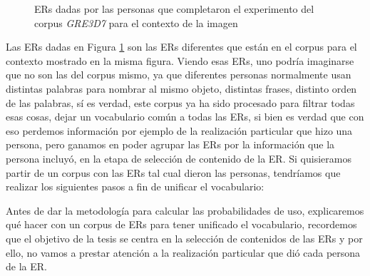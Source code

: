 \begin{figure}[H]
\begin{minipage}[b]{0.5\linewidth}
{%
}
\end{minipage}
\caption{ERs dadas por las personas que completaron el experimento del corpus \textit{GRE3D7} para el contexto de la imagen}\label{fig4-4}
\end{figure}
Las ERs dadas en Figura \ref{fig4-4} son las ERs diferentes que est\'an en el corpus para el contexto mostrado en la misma figura. Viendo esas ERs, uno podr\'ia imaginarse que no son las del corpus mismo, ya que diferentes personas normalmente usan distintas palabras para nombrar al mismo objeto, distintas frases, distinto orden de las palabras, s\'i es verdad, este corpus ya ha sido procesado para filtrar todas esas cosas, dejar un vocabulario com\'un a todas las ERs, si bien es verdad que con eso perdemos informaci\'on por ejemplo de la realizaci\'on particular que hizo una persona, pero ganamos en poder agrupar las ERs por la informaci\'on que la persona incluy\'o, en la etapa de selecci\'on de contenido de la ER. Si quisieramos partir de un corpus con las ERs tal cual dieron las personas, tendr\'iamos que realizar los siguientes pasos a fin de unificar el vocabulario:

Antes de dar la metodolog\'ia para calcular las probabilidades de uso, explicaremos qu\'e hacer con un corpus de ERs para tener unificado el vocabulario, recordemos que el objetivo de la tesis se centra en la selecci\'on de contenidos de las ERs y por ello, no vamos a prestar atenci\'on a la realizaci\'on particular que di\'o cada persona de la ER. 

